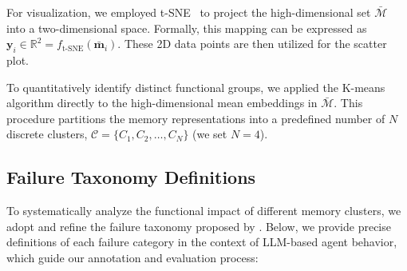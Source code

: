 \documentclass[]{fairmeta}
\begin{document}
For visualization, we employed t-SNE~\citep{maaten2008visualizing} to project the high-dimensional set $\mathcal{\bar{M}}$ into a two-dimensional space.  Formally, this mapping can be expressed as $\mathbf{y}_i \in \mathbb{R}^2= f_\text{t-SNE}(\bar{\mathbf{m}}_i)$. These 2D data points are then utilized for the scatter plot.

To quantitatively identify distinct functional groups, we applied the K-means algorithm directly to the high-dimensional mean embeddings in $\mathcal{\bar{M}}$. This procedure partitions the memory representations into a predefined number of $N$ discrete clusters, $\mathcal{C} = \{C_1, C_2, \ldots, C_N\}$ (we set $N=4$). 

\subsection{Failure Taxonomy Definitions}
\label{app:taxonomy}

To systematically analyze the functional impact of different memory clusters, we adopt and refine the failure taxonomy proposed by \citet{song2025failure-taxonomy}. Below, we provide precise definitions of each failure category in the context of LLM-based agent behavior, which guide our annotation and evaluation process:
\end{document}
